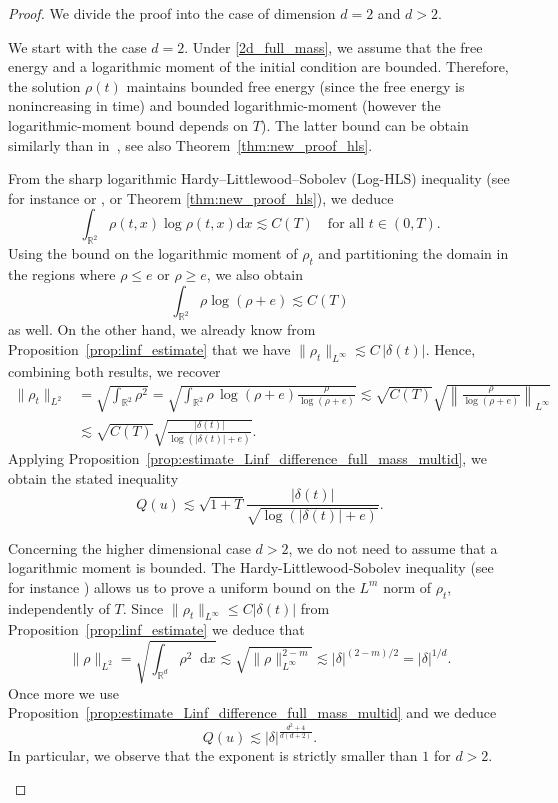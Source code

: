 \documentclass[11pt,a4paper]{article}
\numberwithin{equation}{section}
\newcommand{\R}{{\mathbb{R}}}
\theoremstyle{plain}
\theoremstyle{remark}
\newcommand {\f}{\frac}
\newcommand{\diff}{\mathop{}\!\mathrm{d}}
\newcommand{\step}[1][]{%
  \if\relax\detokenize{#1}\relax
    \def\thisstep{.}%
  \else
    \def\thisstep{: \protect #1.}%
  \fi
  \item}
\begin{document}
\begin{proof}
We divide the proof into the case of dimension $d=2$ and $d > 2$.

\begin{enumeratesteps}
    \step[Dimension $d=2$]
We start with the case $d=2$. Under \ref{2d_full_mass}, we assume that the free energy and a logarithmic moment of the initial condition are bounded.  Therefore, the solution $\rho(t)$ maintains bounded free energy (since the free energy is nonincreasing in time) and bounded logarithmic-moment (however the logarithmic-moment bound depends on $T$). The latter bound can be obtain similarly than in~\cite{Fernandez_Mischler16, Calvez_Corrias08}, see also Theorem~\ref{thm:new_proof_hls}.

From the sharp logarithmic Hardy--Littlewood--Sobolev (Log-HLS) inequality (see for instance \cite{Carlen_Loss92,Beckner93} or \cite[Lemma~0.3]{Dolbeault_Perthame04}, or Theorem \ref{thm:new_proof_hls}), we deduce
\[
\int_{\R^2} \rho(t,x)\log\rho(t,x) \mathrm{d}x   \lesssim C(T)
\quad\text{for all }t\in(0,T).
\]
Using the bound on the logarithmic moment of $\rho_t$
and partitioning the domain in the regions where $\rho\le e$ or $\rho\ge e$, we also obtain
\[
\int_{\R^2}\rho  \log(\rho + e)
   \lesssim  
C(T)
\]
as well.
On the other hand, we already know from Proposition~\ref{prop:linf_estimate} that we have
$
\|\rho_t\|_{L^\infty}
   \lesssim  
C\,\lvert\delta(t)\rvert.
$
Hence, combining both results, we recover
\begin{align*}
\|\rho_t\|_{L^2} & = \sqrt{\int_{\R^2}\rho^2} =  
\sqrt{\int_{\R^2}\rho\,\log(\rho+e)  \f{\rho}{\log(\rho+e)}}
   \lesssim  \sqrt{C(T)}  \sqrt{\left\|\f{\rho}{\log(\rho+e)}\right\|_{L^\infty}} \\
   & \lesssim  
\sqrt{C(T)}  \sqrt{\f{\lvert\delta(t)\rvert}{\log(\lvert\delta(t)\rvert+e) }}.
\end{align*}
Applying Proposition~\ref{prop:estimate_Linf_difference_full_mass_multid}, we obtain the stated inequality
\[
Q(u)
   \lesssim  
\sqrt{1+T}  \f{\lvert\delta(t)\rvert}{\sqrt{\log(\lvert\delta(t)\rvert + e)}}.
\]

\step[Dimension $d > 2$]
Concerning the higher dimensional case $d>2$, we do not need to assume that a logarithmic moment is bounded. The Hardy-Littlewood-Sobolev inequality (see for instance \cite{Blanchet_Carrillo_Laurencot09, Calvez_Carrillo_Hoffmann17}) allows us to prove a uniform bound on the $L^m$ norm of $\rho_t$, independently of $T$. Since $\|\rho_t\|_{L^\infty}\le C|\delta(t)|$ from Proposition~\ref{prop:linf_estimate} we deduce that 
$$
    \|\rho\|_{L^2}=\sqrt{\int_{\R^d}\rho^2\diff x}\lesssim \sqrt{\|\rho\|_{L^{\infty}}^{2-m}}\lesssim |\delta|^{(2-m)/2}= |\delta|^{1/d} .
$$
Once more we use Proposition~\ref{prop:estimate_Linf_difference_full_mass_multid} and we deduce
\[
Q(u)  \lesssim |\delta|^{\f{d^2+4}{d(d+2)}} .
\]
In particular, we observe that the exponent is strictly smaller than $1$ for $d>2$. \qedhere
\end{enumeratesteps}
\end{proof}
\end{document}
